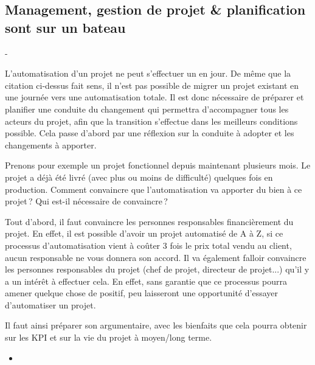 
\subsection{Management, gestion de projet \& planification sont sur un bateau}


\epigraph{}{ - \citeauthor{manmonth} \cite{manmonth}}

L'automatisation d'un projet ne peut s'effectuer un en jour. De même que la citation ci-dessus fait sens, il n'est pas possible de migrer un projet existant en une journée vers une automatisation totale. Il est donc nécessaire de préparer et planifier une conduite du changement qui permettra d'accompagner tous les acteurs du projet, afin que la transition s'effectue dans les meilleurs conditions possible. Cela passe d'abord par une réflexion sur la conduite à adopter et les changements à apporter. 

Prenons pour exemple un projet fonctionnel depuis maintenant plusieurs mois. Le projet a déjà été livré (avec plus ou moins de difficulté) quelques fois en production. Comment convaincre que l'automatisation va apporter du bien à ce projet ? Qui est-il nécessaire de convaincre ?

Tout d'abord, il faut convaincre les personnes responsables financièrement du projet. En effet, il est possible d'avoir un projet automatisé de A à Z, si ce processus d'automatisation vient à coûter 3 fois le prix total vendu au client, aucun responsable ne vous donnera son accord. Il va également falloir convaincre les personnes responsables du projet (chef de projet, directeur de projet...) qu'il y a un intérêt à effectuer cela. En effet, sans garantie que ce processus pourra amener quelque chose de positif, peu laisseront une opportunité d'essayer d'automatiser un projet.


Il faut ainsi préparer son argumentaire, avec les bienfaits que cela pourra obtenir sur les \gls{KPI} et sur la vie du projet à moyen/long terme.

\begin{itemize}
	\item {}
\end{itemize}

